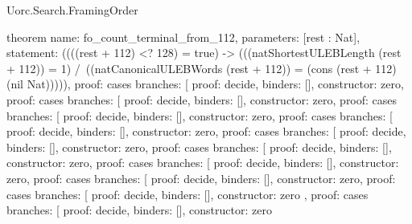\begin{lexlean}{Uorc.Search.FramingOrder}
\begin{semanticmodule}
theorem{
  name: fo_count_terminal_from_112,
  parameters: [rest : Nat],
  statement: ((((rest + 112) <? 128) = true) -> (((natShortestULEBLength (rest + 112)) = 1) /\ ((natCanonicalULEBWords (rest + 112)) = (cons (rest + 112) (nil Nat))))),
  proof: cases{
    branches: [
      {proof: decide{}, binders: [], constructor: zero},
      {
        proof: cases{
          branches: [
            {proof: decide{}, binders: [], constructor: zero},
            {
              proof: cases{
                branches: [
                  {proof: decide{}, binders: [], constructor: zero},
                  {
                    proof: cases{
                      branches: [
                        {proof: decide{}, binders: [], constructor: zero},
                        {
                          proof: cases{
                            branches: [
                              {proof: decide{}, binders: [], constructor: zero},
                              {
                                proof: cases{
                                  branches: [
                                    {proof: decide{}, binders: [], constructor: zero},
                                    {
                                      proof: cases{
                                        branches: [
                                          {proof: decide{}, binders: [], constructor: zero},
                                          {
                                            proof: cases{
                                              branches: [
                                                {proof: decide{}, binders: [], constructor: zero},
                                                {
                                                  proof: cases{
                                                    branches: [
                                                      {
                                                        proof: decide{},
                                                        binders: [],
                                                        constructor: zero
                                                      },
                                                      {
                                                        proof: cases{
                                                          branches: [
                                                            {
                                                              proof: decide{},
                                                              binders: [],
                                                              constructor: zero
}}}}}}}}}}}}}}}}}}}}}
\end{semanticmodule}
\end{lexlean}
